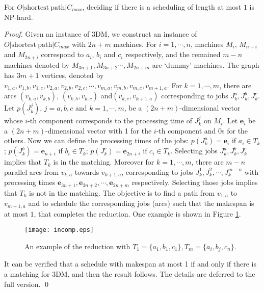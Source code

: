 \documentclass{llncs}
\numberwithin{subcase}{case}
\begin{document}
\begin{theorem}
For $O|\mathrm{shortest}~\mathrm{path}|C_{max}$, deciding if there is a scheduling of length at most $1$ is $\mathrm{NP}$-hard. \label{th_inapp}
\end{theorem}
\begin{proof}
Given an instance of 3DM, we construct an instance of $O|\mathrm{shortest}~\mathrm{path}|C_{max}$ with $2n + m$ machines. For $i = 1, \cdots, n$, machines $M_i$, $M_{n + i}$ and $M_{2n + i}$ correspond to $a_i$, $b_i$ and $c_i$ respectively, and the remained $m - n$ machines denoted by $M_{3n + 1},M_{3n + 2}\cdots, M_{2n+m}$ are `dummy' machines. The graph has $3m + 1$ vertices, denoted by $v_{1,a}, v_{1,b}, v_{1,c}, v_{2,a}, v_{2,b}, v_{2,c}, \cdots, v_{m, a}, v_{m, b}, v_{m, c}, v_{m+1,a}$. For $k = 1, \cdots, m$, there are arcs $(v_{k,a}, v_{k,b})$, $(v_{k,b}, v_{k,c})$ and$(v_{k,c}, v_{k + 1,a})$ corresponding to jobs $J^a_k, J^b_k, J^c_k$. Let $p(J^j_k)$, $j=a,b,c$ and $k = 1, \cdots, m$, be a $(2n + m)$-dimensional vector whose $i$-th component corresponds to the processing time of $J^j_k$ on $M_i$. Let $\mathbf{e}_{i}$ be a $(2n + m)$-dimensional vector with 1 for the $i$-th component and $0$s for the others. Now we can define the processing times of the jobs: $p(J^a_k) = \mathbf{e}_i$ if $a_i\in T_k$; $p(J^b_k) = \mathbf{e}_{n+i}$ if $b_i\in T_k$; $p(J^c_k) =\mathbf{e}_{2n+i}$ if $c_i\in T_k$. Selecting jobs $J^a_k, J^b_k, J^c_k$ implies that $T_k$ is in the matching. Moreover for $k = 1, \cdots, m$, there are $m - n$ parallel arcs from $v_{k,a}$ towards $v_{k+1, a}$, corresponding to jobs $J^1_k, J^2_k, \cdots, J^{m-n}_k$ with processing times $\mathbf{e}_{3n + 1}, \mathbf{e}_{3n + 2}, \cdots, \mathbf{e}_{2n+m}$ respectively. Selecting those jobs implies that $T_k$ is not in the matching. The objective is to find a path from $v_{1,a}$ to $v_{m+1,a}$ and to schedule the corresponding jobs (arcs) such that the makespan is at most $1$, that completes the reduction. One example is shown in Figure \ref{fig_inapp_2}.

\begin{figure}[ht]
  \centering
  \texttt{[image: incomp.eps]}\\
  \caption{An example of the reduction with $T_1 = \{a_1, b_1, c_1\}, T_m = \{a_i, b_j, c_n\}$.}\label{fig_inapp_2}
\end{figure}

It can be verified that a schedule with makespan at most 1 if and only if there is a matching for 3DM, and then the result follows. The details are deferred to the full version.
\qed
\end{proof}
\end{document}
